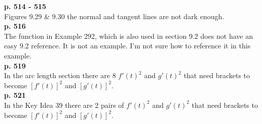 \documentclass[11pt]{report}
\begin{document}
\textbf{p. 514 - 515}\\
Figures 9.29 \& 9.30 the normal and tangent lines are not dark enough. \\

\textbf{p. 516}\\
The function in Example 292, which is also used in section 9.2 does not have an easy 9.2 reference. It is not an example. I'm not sure how to reference it in this example.\\

\textbf{p. 519}\\
In the arc length section there are 8 $f'(t)^2$ and $g'(t)^2$ that need brackets to become  $[f'(t)]^2$ and $[g'(t)]^2$.\\ 

\textbf{p. 521}\\
In the Key Idea 39 there are 2 pairs of $f'(t)^2$ and $g'(t)^2$ that need brackets to become  $[f'(t)]^2$ and $[g'(t)]^2$.\\
\end{document}
